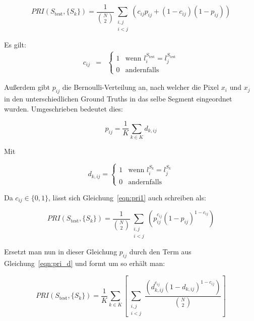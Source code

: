 \begin{equation}
\label{eqn:pri1}
PRI(S_\text{test}, \{S_k\}) = \frac{1}{\binom{N}{2}} \sum_{\substack{i,j\\i<j}} \left(c_{ij}p_{ij}+\left(1-c_{ij}\right)\left(1-p_{ij}\right)\right)
\end{equation}

Es gilt:
\begin{eqnarray}
c_{ij}&=&\begin{cases}
1 & \text{wenn } l_i^{S_\text{test}}=l_j^{S_\text{test}}\\
0 & \text{andernfalls}
\end{cases}
\end{eqnarray}

Außerdem gibt $p_{ij}$ die Bernoulli-Verteilung an, nach welcher die Pixel $x_i$ und $x_j$ in den unterschiedlichen Ground Truths in das selbe Segment eingeordnet wurden. Umgeschrieben bedeutet dies:

\begin{equation}
p_{ij} = \frac{1}{K}\sum_{k\in K}d_{k, ij}
\end{equation}

Mit

\begin{equation}
\label{eqn:pri_d}
d_{k, ij} = \begin{cases}
1 & \text{wenn } l_i^{S_k}=l_j^{S_k}\\
0 & \text{andernfalls}
\end{cases}
\end{equation}

Da $c_{ij}\in\{0,1\}$, lässt sich Gleichung~\ref{eqn:pri1} auch schreiben als: \cite{pantofaru_07}

\begin{equation}
PRI(S_\text{test}, \{S_k\}) = \frac{1}{\binom{N}{2}} \sum_{\substack{i,j\\i<j}} \left(p_{ij}^{c_{ij}}\left(1-p_{ij}\right)^{1-c_{ij}}\right)
\end{equation}

Ersetzt man nun in dieser Gleichung $p_{ij}$ durch den Term aus Gleichung~\ref{eqn:pri_d} und formt um so erhält man:

\begin{equation}
\label{eqn:pri_repl}
PRI(S_\text{test}, \{S_k\}) = \frac{1}{K}\sum_{k\in K}\left[ \sum_{\substack{i,j\\i<j}}\frac{\left(d_{k,ij}^{c_{ij}}\left(1-d_{k,ij}\right)^{1-c_{ij}}\right)}{\binom{N}{2}}\right]
\end{equation}

